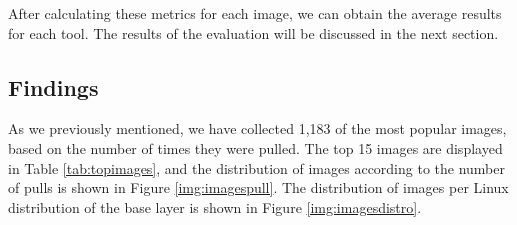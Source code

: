 After calculating these metrics for each image, we can obtain the average results for each tool. The results of the evaluation will be discussed in the next section.

\subsection{Findings}

As we previously mentioned, we have collected 1,183 of the most popular images, based on the number of times they were pulled. The top 15 images are displayed in Table \ref{tab:topimages}, and the distribution of images according to the number of pulls is shown in Figure \ref{img:imagespull}. The distribution of images per Linux distribution of the base layer is shown in Figure \ref{img:imagesdistro}.


